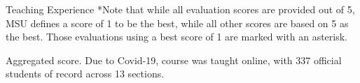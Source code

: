 \documentclass{resume} %
\begin{document}
\begin{rSection}{Teaching Experience}
*Note that while all evaluation scores are provided out of 5, MSU defines a score of 1 to be the best, while all other scores are based on 5 as the best.
Those evaluations using a best score of 1 are marked with an asterisk.

\textdagger Aggregated score.  Due to Covid-19, course was taught online, with 337 official students of record across 13 sections.



\end{rSection}


\end{document}
